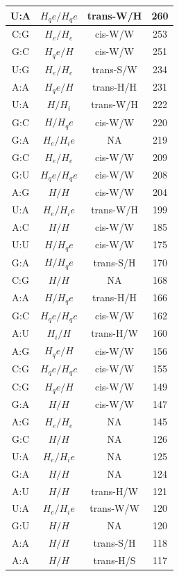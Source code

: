 \begin{center}
\begin{longtable}{c|c|c|c}
U:A & $H_qe/H_qe$ & trans-W/H & 260 \\  \hline
C:G & $H_e/H_e$ & cis-W/W & 253 \\  \hline
G:C & $H_qe/H$ & cis-W/W & 251 \\  \hline
U:G & $H_e/H_e$ & trans-S/W & 234 \\  \hline
A:A & $H_qe/H$ & trans-H/H & 231 \\  \hline
U:A & $H/H_i$ & trans-W/H & 222 \\  \hline
G:C & $H/H_qe$ & cis-W/W & 220 \\  \hline
G:A & $H_e/H_ie$ & NA & 219 \\  \hline
G:C & $H_e/H_e$ & cis-W/W & 209 \\  \hline
G:U & $H_qe/H_qe$ & cis-W/W & 208 \\  \hline
A:G & $H/H$ & cis-W/W & 204 \\  \hline
U:A & $H_e/H_ie$ & trans-W/H & 199 \\  \hline
A:C & $H/H$ & cis-W/W & 185 \\  \hline
U:U & $H/H_qe$ & cis-W/W & 175 \\  \hline
G:A & $H/H_qe$ & trans-S/H & 170 \\  \hline
C:G & $H/H$ & NA & 168 \\  \hline
A:A & $H/H_qe$ & trans-H/H & 166 \\  \hline
G:C & $H_qe/H_qe$ & cis-W/W & 162 \\  \hline
A:U & $H_i/H$ & trans-H/W & 160 \\  \hline
A:G & $H_qe/H$ & cis-W/W & 156 \\  \hline
C:G & $H_qe/H_qe$ & cis-W/W & 155 \\  \hline
C:G & $H_qe/H$ & cis-W/W & 149 \\  \hline
G:A & $H/H$ & cis-W/W & 147 \\  \hline
A:G & $H_e/H_e$ & NA & 145 \\  \hline
G:C & $H/H$ & NA & 126 \\  \hline
U:A & $H_e/H_ie$ & NA & 125 \\  \hline
G:A & $H/H$ & NA & 124 \\  \hline
A:U & $H/H$ & trans-H/W & 121 \\  \hline
U:A & $H_e/H_ie$ & trans-W/W & 120 \\  \hline
G:U & $H/H$ & NA & 120 \\  \hline
A:A & $H/H$ & trans-S/H & 118 \\  \hline
A:A & $H/H$ & trans-H/S & 117 \\  \hline

\end{longtable}
\end{center}

